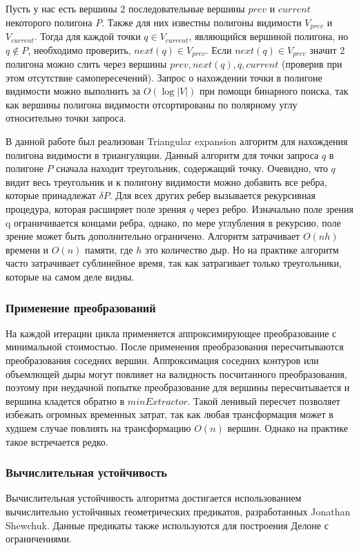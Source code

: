 \documentclass{fefu_thesis/cls/fefu}
\begin{document}
    Пусть у нас есть вершины 2 последовательные вершины $prev$ и $current$ некоторого полигона $P$. Также для них известны полигоны видимости $V_{prev}$ и $V_{current}$. Тогда для каждой точки $q \in V_{current}$, являющийся вершиной полигона, но $q \notin P$, необходимо проверить, $next\left(q\right) \in V_{prev}$. Если $next\left(q\right) \in V_{prev}$ значит 2 полигона можно слить через вершины $prev, next\left(q\right), q, current$ (проверив при этом отсутствие самопересечений). Запрос о нахождении точки в полигоне видимости можно выполнить за $O\left(\log \left|V\right|\right)$ при помощи бинарного поиска, так как вершины полигона видимости отсортированы по полярному углу относительно точки запроса.

    В данной работе был реализован Triangular expansion\cite{TriangularExpansion} алгоритм для нахождения полигона видимости в триангуляции. Данный алгоритм для точки запроса $q$ в полигоне $P$ сначала находит треугольник, содержащий точку. Очевидно, что $q$ видит весь треугольник и к полигону видимости можно добавить все ребра, которые принадлежат $\delta P$. Для всех других ребер вызывается рекурсивная процедура, которая расширяет поле зрения $q$ через ребро. Изначально поле зрения q ограничивается концами ребра, однако, по мере углубления в рекурсию, поле зрение может быть дополнительно ограничено. Алгоритм затрачивает $O\left(nh\right)$ времени и $O\left(n\right)$ памяти, где $h$ это количество дыр. Но на практике алгоритм часто затрачивает сублинейное время, так как затрагивает только треугольники, которые на самом деле видны.

    \subsubsection{Применение преобразований}
    На каждой итерации цикла применяется аппроксимирующее преобразование с минимальной стоимостью. После применения преобразования пересчитываются преобразования соседних вершин.
    Аппроксимация соседних контуров или объемлющей дыры могут повлияет на валидность посчитанного преобразования, поэтому при неудачной попытке преобразование для вершины пересчитывается и вершина кладется обратно в $minExtractor$. Такой ленивый пересчет позволяет избежать огромных временных затрат, так как любая трансформация может в худшем случае повлиять на трансформацию $O\left(n\right)$ вершин. Однако на практике такое встречается редко.

    \subsubsection{Вычислительная устойчивость}
    Вычислительная устойчивость алгоритма достигается использованием вычислительно устойчивых геометрических предикатов, разработанных Jonathan Shewchuk\cite{shewchuk97a}. Данные предикаты также используются для построения Делоне с ограничениями.
\end{document}
